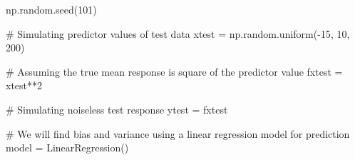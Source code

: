 \documentclass[
  letterpaper,
  DIV=11,
  numbers=noendperiod]{scrreprt}
\newenvironment{Shaded}{\begin{snugshade}}{\end{snugshade}}
\newcommand{\CommentTok}[1]{\textcolor[rgb]{0.37,0.37,0.37}{#1}}
\newcommand{\DecValTok}[1]{\textcolor[rgb]{0.68,0.00,0.00}{#1}}
\newcommand{\NormalTok}[1]{\textcolor[rgb]{0.00,0.23,0.31}{#1}}
\newcommand{\OperatorTok}[1]{\textcolor[rgb]{0.37,0.37,0.37}{#1}}
\begin{document}
\begin{Shaded}
\begin{Highlighting}[]
\NormalTok{np.random.seed(}\DecValTok{101}\NormalTok{)}

\CommentTok{\# Simulating predictor values of test data}
\NormalTok{xtest }\OperatorTok{=}\NormalTok{ np.random.uniform(}\OperatorTok{{-}}\DecValTok{15}\NormalTok{, }\DecValTok{10}\NormalTok{, }\DecValTok{200}\NormalTok{)}

\CommentTok{\# Assuming the true mean response is square of the predictor value}
\NormalTok{fxtest }\OperatorTok{=}\NormalTok{ xtest}\OperatorTok{**}\DecValTok{2}

\CommentTok{\# Simulating noiseless test response }
\NormalTok{ytest }\OperatorTok{=}\NormalTok{ fxtest}

\CommentTok{\# We will find bias and variance using a linear regression model for prediction}
\NormalTok{model }\OperatorTok{=}\NormalTok{ LinearRegression()}
\end{Highlighting}
\end{Shaded}
\end{document}
